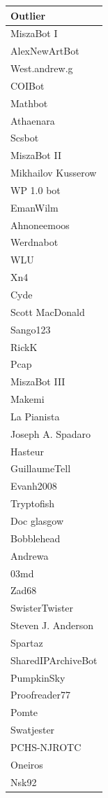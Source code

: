 \documentclass{article}
\begin{document}
\begin{landscape}
\begin{table}
\begin{center}
\tiny
\begin{tabular}{l}
\hline
Outlier \\
\hline
MiszaBot I \\
AlexNewArtBot \\
West.andrew.g \\
COIBot \\
Mathbot \\
Athaenara \\
Scsbot \\
MiszaBot II \\
Mikhailov Kusserow \\
WP 1.0 bot \\
EmanWilm \\
Ahnoneemoos \\
Werdnabot \\
WLU \\
Xn4 \\
Cyde \\
Scott MacDonald \\
Sango123 \\
RickK \\
Pcap \\
MiszaBot III \\
Makemi \\
La Pianista \\
Joseph A. Spadaro \\
Hasteur \\
GuillaumeTell \\
Evanh2008 \\
Tryptofish \\
Doc glasgow \\
Bobblehead \\
Andrewa \\
03md \\
Zad68 \\
SwisterTwister \\
Steven J. Anderson \\
Spartaz \\
SharedIPArchiveBot \\
PumpkinSky \\
Proofreader77 \\
Pomte \\
Swatjester \\
PCHS-NJROTC \\
Oneiros \\
Nsk92 \\

\end{tabular}
\end{center}
\end{table}
\end{landscape}
\end{document}
